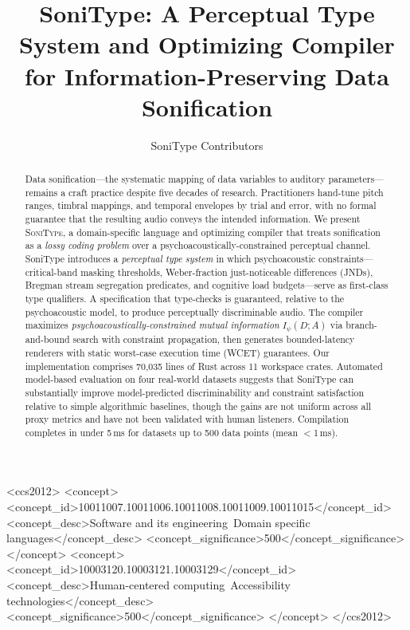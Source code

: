 \documentclass[sigchi, nonacm]{acmart}
\begin{document}
\title{SoniType: A Perceptual Type System and Optimizing Compiler for Information-Preserving Data Sonification}

\author{SoniType Contributors}

\begin{abstract}
Data sonification---the systematic mapping of data variables to auditory parameters---remains a craft practice despite five decades of research. Practitioners hand-tune pitch ranges, timbral mappings, and temporal envelopes by trial and error, with no formal guarantee that the resulting audio conveys the intended information. We present \textsc{SoniType}, a domain-specific language and optimizing compiler that treats sonification as a \emph{lossy coding problem} over a psychoacoustically-constrained perceptual channel. SoniType introduces a \emph{perceptual type system} in which psychoacoustic constraints---critical-band masking thresholds, Weber-fraction just-noticeable differences (JNDs), Bregman stream segregation predicates, and cognitive load budgets---serve as first-class type qualifiers. A specification that type-checks is guaranteed, relative to the psychoacoustic model, to produce perceptually discriminable audio. The compiler maximizes \emph{psychoacoustically-constrained mutual information} $I_\psi(D; A)$ via branch-and-bound search with constraint propagation, then generates bounded-latency renderers with static worst-case execution time (WCET) guarantees. Our implementation comprises 70,035 lines of Rust across 11 workspace crates. Automated model-based evaluation on four real-world datasets suggests that SoniType can substantially improve model-predicted discriminability and constraint satisfaction relative to simple algorithmic baselines, though the gains are not uniform across all proxy metrics and have not been validated with human listeners. Compilation completes in under 5\,ms for datasets up to 500 data points (mean $<$1\,ms).
\end{abstract}

\begin{CCSXML}
<ccs2012>
<concept>
<concept_id>10011007.10011006.10011008.10011009.10011015</concept_id>
<concept_desc>Software and its engineering~Domain specific languages</concept_desc>
<concept_significance>500</concept_significance>
</concept>
<concept>
<concept_id>10003120.10003121.10003129</concept_id>
<concept_desc>Human-centered computing~Accessibility technologies</concept_desc>
<concept_significance>500</concept_significance>
</concept>
</ccs2012>
\end{CCSXML}
\end{document}
